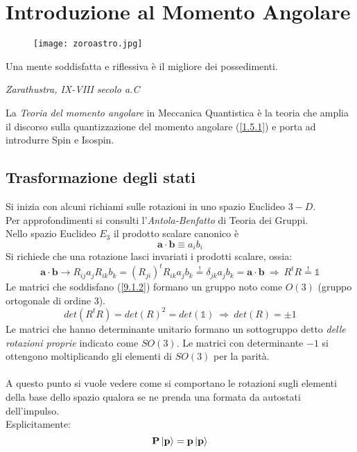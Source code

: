 \documentclass[twoside]{article}
\renewcommand{\vec}[1]{\textbf{#1}}
\begin{document}
\newpage

\section{Introduzione al Momento Angolare}

\begin{wrapfigure}[4]{L}{0.2\textwidth}
  \begin{center}
    \texttt{[image: zoroastro.jpg]}
  \end{center}
\end{wrapfigure}\leavevmode

\vspace{9mm}
\epigraph{Una mente soddisfatta e riflessiva è il migliore dei possedimenti.}{\textit{Zarathustra, IX-VIII secolo a.C}}
\vspace{9mm}

La \textit{Teoria del momento angolare} in Meccanica Quantistica è la teoria che amplia il discorso sulla quantizzazione del momento angolare (\ref{1.5.1}) e porta ad introdurre Spin e Isospin.

\vspace{0.5cm}

\subsection{Trasformazione degli stati}
Si inizia con alcuni richiami sulle rotazioni in uno spazio Euclideo $3-D$.
\\
Per approfondimenti si consulti l'\textit{Antola-Benfatto} di Teoria dei Gruppi.
\\
Nello spazio Euclideo $E_3$ il prodotto scalare canonico è 
\begin{equation}
    \vec{a}\cdot \vec{b} \equiv a_i b_i
\end{equation}
Si richiede che una rotazione lasci invariati i prodotti scalare, ossia:
\begin{equation} \label{9.1.2}
    \vec{a}\cdot\vec{b} \rightarrow R_{ij}a_j R_{ik}b_k=(R_{ji})^t R_{ik}a_j b_k \overset{!}{=} \delta_{jk}a_j b_k = \vec{a}\cdot \vec{b} \ \Rightarrow \ R^t R \overset{!}{=} \mathds{1}
\end{equation}
Le matrici che soddisfano (\ref{9.1.2}) formano un gruppo noto come $O(3)$ (gruppo ortogonale di ordine 3).
\begin{equation}
    det(R^t R)= det(R)^2=det(\mathds{1}) \ \Rightarrow \ det(R)=\pm 1
\end{equation}
Le matrici che hanno determinante unitario formano un sottogruppo detto \textit{delle rotazioni proprie} indicato come $SO(3)$. Le matrici con determinante $-1$ si ottengono moltiplicando gli elementi di $SO(3)$ per la parità.
\\
\\
A questo punto si vuole vedere come si comportano le rotazioni sugli elementi della base dello spazio qualora se ne prenda una formata da autostati dell'impulso.
\\
Esplicitamente:
\begin{equation*}
    \vec{P}\ket{\vec{p}}=\vec{p}\ket{\vec{p}}
\end{equation*}
\end{document}
